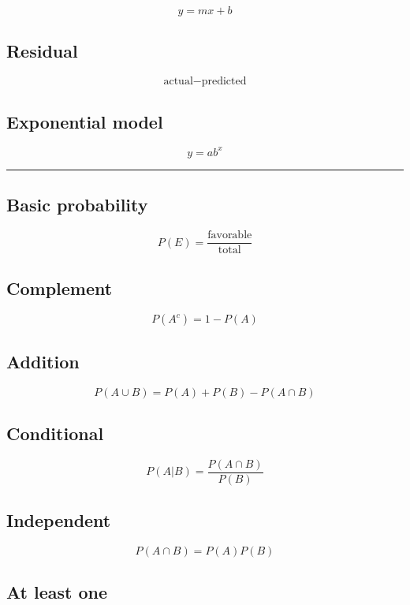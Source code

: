 \documentclass[
]{article}
\begin{document}
\[
\boxed{y=mx+b}
\]

\subsection{Residual}\label{residual-1}

\[
\boxed{\text{actual}-\text{predicted}}
\]

\subsection{Exponential model}\label{exponential-model}

\[
\boxed{y=ab^x}
\]

\begin{center}\rule{0.5\linewidth}{0.5pt}\end{center}

\subsection{Basic probability}\label{basic-probability-1}

\[
\boxed{
P(E)=
\frac{\text{favorable}}
{\text{total}}
}
\]

\subsection{Complement}\label{complement-1}

\[
\boxed{P(A^c)=1-P(A)}
\]

\subsection{Addition}\label{addition}

\[
\boxed{
P(A\cup B)
=
P(A)+P(B)-P(A\cap B)
}
\]

\subsection{Conditional}\label{conditional}

\[
\boxed{
P(A|B)
=
\frac{P(A\cap B)}
{P(B)}
}
\]

\subsection{Independent}\label{independent}

\[
\boxed{
P(A\cap B)=P(A)P(B)
}
\]

\subsection{At least one}\label{at-least-one-1}
\end{document}
